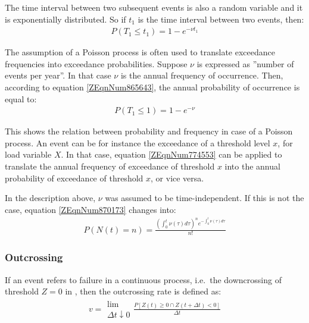 {The time interval between two subsequent events is also a random variable and it is exponentially distributed.
So if $t_{1}$ is the time interval between two events, then:
\begin{align}
P\left(T_{1} \le t_{1} \right)=1-e^{-\nu t_{1} } \label{ZEqnNum865643} 
\end{align}

The assumption of a Poisson process is often used to translate exceedance frequencies into exceedance probabilities.
Suppose $\nu$ is expressed as ''number of events per year''.
In that case $\nu$ is the annual frequency of occurrence.
Then, according to equation \eqref{ZEqnNum865643}, the annual probability of occurrence is equal to: 
\begin{align}
P\left(T_{1} \le 1\right)=1-e^{-\nu } \label{ZEqnNum774553} 
\end{align}

This shows the relation between probability and frequency in case of a Poisson process.
An event can be for instance the exceedance of a threshold level $x$, for load variable $X$.
In that case, equation \eqref{ZEqnNum774553} can be applied to translate the annual frequency of exceedance of threshold $x$ into the annual probability of exceedance of threshold $x$, or vice versa.

In the description above, $\nu$ was assumed to be time-independent.
If this is not the case, equation \eqref{ZEqnNum870173} changes into:
\begin{align}
P\left(N(t)=n\right)=\frac{\left(\int _{0}^{t}\nu \left(\tau \right)d\tau  \right)^{n} e^{-\int _{0}^{t}\nu \left(\tau \right)d\tau  } }{n!} \label{0.171)} 
\end{align}

\subsubsection{Outcrossing}\label{Section_2.4.5.3} 

If an event refers to failure in a continuous process, i.e.\ the downcrossing of threshold $Z=0$ in , then the outcrossing rate is defined as:
\begin{align}
v=\begin{array}{c} {\lim } \\ {\Delta t\downarrow 0} \end{array}  \frac{P\left[Z\left(t\right)\ge 0\cap Z\left(t+\Delta t\right)<0\right]}{\Delta t} \label{ZEqnNum351501} 
\end{align}

}
